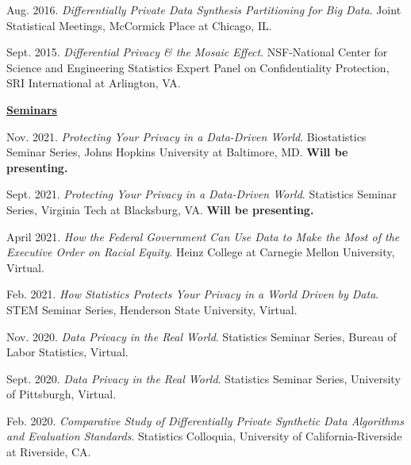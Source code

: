 \documentclass[11pt, letterpaper, roman]{moderncv} %
\begin{document}
\begin{etaremune}[topsep=0pt, itemsep=6pt, partopsep=0pt, parsep=0pt]
    \item Aug. 2016. \textit{Differentially Private Data Synthesis Partitioning for Big Data}. Joint Statistical Meetings, McCormick Place at Chicago, IL.
    
    \item Sept. 2015. \textit{Differential Privacy \& the Mosaic Effect}. NSF-National Center for Science and Engineering Statistics Expert Panel on Confidentiality Protection, SRI International at Arlington, VA.

\vspace{4pt}
\hspace{-0.30in}\underline{\textbf{\large Seminars}}\normalsize

    
    \item Nov. 2021. \textit{Protecting Your Privacy in a Data-Driven World}. Biostatistics Seminar Series, Johns Hopkins University at Baltimore, MD. \textbf{Will be presenting.}
    
    \item Sept. 2021. \textit{Protecting Your Privacy in a Data-Driven World}. Statistics Seminar Series, Virginia Tech at Blacksburg, VA. \textbf{Will be presenting.}
    
    \item April 2021. \textit{How the Federal Government Can Use Data to Make the Most of the Executive Order on Racial Equity}. Heinz College at Carnegie Mellon University, Virtual.

    \item Feb. 2021. \textit{How Statistics Protects Your Privacy in a World Driven by Data}. STEM Seminar Series, Henderson State University, Virtual.

    \item Nov. 2020. \textit{Data Privacy in the Real World}. Statistics Seminar Series, Bureau of Labor Statistics, Virtual.

    \item Sept. 2020. \textit{Data Privacy in the Real World}. Statistics Seminar Series, University of Pittsburgh, Virtual.
    
    \item Feb. 2020. \textit{Comparative Study of Differentially Private Synthetic Data Algorithms and Evaluation Standards}. Statistics Colloquia, University of California-Riverside at Riverside, CA.
    

\end{etaremune}
\end{document}
